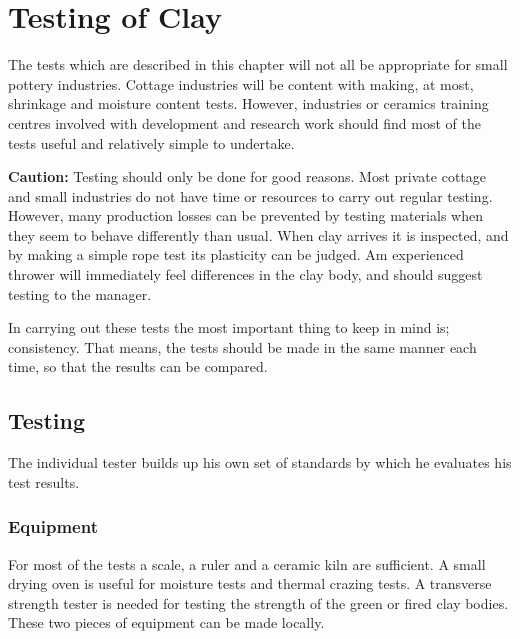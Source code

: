 \chapter{Testing of Clay}
The tests which are described in this chapter will not all be appropriate for 
small pottery industries. Cottage industries will be content with making, at 
most, shrinkage and moisture content tests. However, industries or ceramics 
training centres involved with development and research work should find most 
of the tests useful and relatively simple to undertake.

\textbf{Caution:} Testing should only be done for good reasons. Most private 
cottage and small industries do not have time or resources to carry out regular 
testing. However, many production losses can be prevented by testing materials 
when they seem to behave differently than usual. When clay arrives it is 
inspected, and by making a simple rope test its plasticity can be judged. Am 
experienced thrower will immediately feel differences in the clay body, and 
should suggest testing to the manager.

In carrying out these tests the most important thing to keep in mind is; 
consistency. That means, the tests should be made in the same manner each time, 
so that the results can be compared.
\section{Testing}
The individual tester builds up his own set of standards by which he evaluates 
his test results.
\subsection{Equipment}
For most of the tests a scale, a ruler and a ceramic kiln are sufficient. A 
small drying oven is useful for moisture tests and thermal crazing tests. A 
transverse strength tester is needed for testing the strength of the green or 
fired clay bodies. These two pieces of equipment can be made locally.
